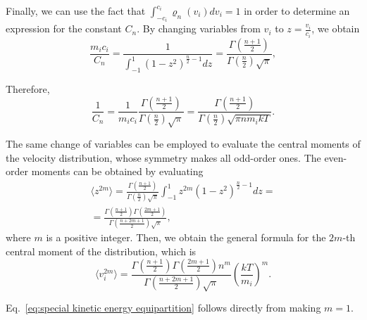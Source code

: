\documentclass[
aip,
jcp,
reprint,
]{revtex4-1}
\newcommand{\nn}{n}
\begin{document}
Finally, we can use the fact that $\int_{-c_i}^{c_i} \varrho_\nn(v_i) dv_i = 1$ in order to determine an expression for the constant $C_\nn$.
By changing variables from $v_i$ to $z = \frac{v_i}{c_i}$, we obtain
\begin{equation*}
\frac{m_i c_i}{C_\nn} = \frac{1}{\int_{-1}^{1} (1-z^2)^{\frac{\nn}{2}-1} dz} = \frac{\Gamma\left(\frac{\nn+1}{2}\right)}{\Gamma\left(\frac{\nn}{2}\right) \sqrt{\pi}},
\end{equation*}

Therefore,
\begin{equation*}
\frac{1}{C_\nn} = \frac{1}{m_i c_i} \frac{\Gamma\left(\frac{\nn+1}{2}\right)}{\Gamma\left(\frac{\nn}{2}\right) \sqrt{\pi}}
= \frac{\Gamma\left(\frac{\nn+1}{2}\right)}{\Gamma\left(\frac{\nn}{2}\right) \sqrt{\pi \nn m_i k T}}.
\end{equation*}

The same change of variables can be employed to evaluate the central moments of the velocity distribution, whose symmetry makes all odd-order ones.
The even-order moments can be obtained by evaluating
\begin{multline*}
\langle z^{2m} \rangle = \frac{\Gamma\left(\frac{\nn+1}{2}\right)}{\Gamma\left(\frac{\nn}{2}\right) \sqrt{\pi}} \int_{-1}^{1} z^{2m} (1-z^2)^{\frac{\nn}{2}-1} dz = \\
=\frac{\Gamma\left(\frac{\nn+1}{2}\right) \Gamma\left(\frac{2m + 1}{2}\right)}{\Gamma\left(\frac{\nn+2m+1}{2}\right) \sqrt{\pi}},
\end{multline*}
where $m$ is a positive integer.
Then, we obtain the general formula for the $2m$-th central moment of the distribution, which is
\begin{equation*}
\langle v_i^{2m} \rangle = \frac{\Gamma\left(\frac{\nn+1}{2}\right) \Gamma\left(\frac{2m + 1}{2}\right) \nn^m}{\Gamma\left(\frac{\nn+2m+1}{2}\right) \sqrt{\pi}}  \left(\frac{kT}{m_i}\right)^m.
\end{equation*}

Eq.~\eqref{eq:special kinetic energy equipartition} follows directly from making $m=1$.


\end{document}
